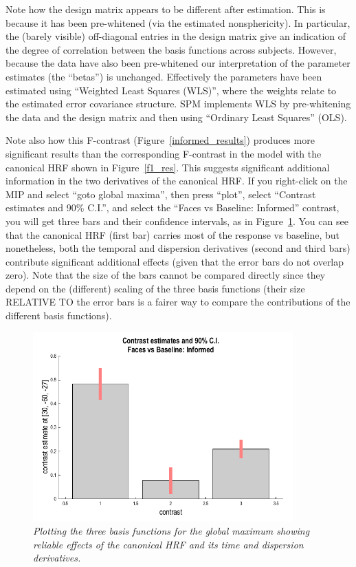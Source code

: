Note how the design matrix appears to be different after estimation. This is because it has been pre-whitened (via the estimated nonsphericity). In particular, the (barely visible) off-diagonal entries in the design matrix give an indication of the degree of correlation between the basis functions across subjects. However, because the data have also been pre-whitened our interpretation of the parameter estimates (the ``betas'') is unchanged. Effectively the parameters have been estimated using ``Weighted Least Squares (WLS)'', where the weights relate to the estimated error covariance structure. SPM implements WLS by pre-whitening the data and the design matrix and then using ``Ordinary Least Squares'' (OLS).

Note also how this F-contrast (Figure~\ref{informed_results}) produces more significant results than the corresponding F-contrast in the model with the canonical HRF shown in Figure~\ref{f1_res}. This suggests significant additional information in the two derivatives of the canonical HRF. If you right-click on the MIP and select ``goto global maxima'', then press ``plot'', select ``Contrast estimates and 90\% C.I.'', and select the ``Faces vs Baseline: Informed'' contrast, you will get three bars and their confidence intervals, as in Figure~\ref{informed_plot}. You can see that the canonical HRF (first bar) carries most of the response vs baseline, but nonetheless, both the temporal and dispersion derivatives (second and third bars) contribute significant additional effects (given that the error bars do not overlap zero). Note that the size of the bars cannot be compared directly since they depend on the (different) scaling of the three basis functions (their size RELATIVE TO the error bars is a fairer way to compare the contributions of the different basis functions).

\begin{figure}
\begin{center}
\includegraphics[width=100mm]{faces_group/informed_plot}
\caption{\em Plotting the three basis functions for the global maximum showing reliable effects of the canonical HRF and its time and dispersion derivatives. \label{informed_plot}}
\end{center}
\end{figure}


